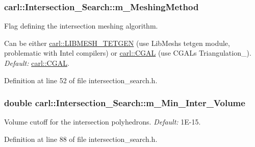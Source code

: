 \subsubsection[{m\+\_\+\+Meshing\+Method}]{ carl\+::\+Intersection\+\_\+\+Search\+::m\+\_\+\+Meshing\+Method\hspace{0.3cm}{\ttfamily [protected]}}\label{classcarl_1_1_intersection___search_afc8983d95c970eaa61c6f4ae50a22f4b}


Flag defining the intersection meshing algorithm. 

Can be either \hyperlink{namespacecarl_a4f72fd25137b97ac1ca1276ec549e5cfa0a91b3dbac7fab7e5efa6f804aab8f58}{carl\+::\+L\+I\+B\+M\+E\+S\+H\+\_\+\+T\+E\+T\+G\+E\+N} (use Lib\+Mesh\textquotesingle{}s tetgen module, problematic with Intel compilers) or \hyperlink{namespacecarl_a4f72fd25137b97ac1ca1276ec549e5cfa509162a828acac7eaad1fc369696a3b1}{carl\+::\+C\+G\+A\+L} (use C\+G\+A\+L\textquotesingle{}s Triangulation\+\_). {\itshape Default\+:} \hyperlink{namespacecarl_a4f72fd25137b97ac1ca1276ec549e5cfa509162a828acac7eaad1fc369696a3b1}{carl\+::\+C\+G\+A\+L}. 

Definition at line 52 of file intersection\+\_\+search.\+h.

\hypertarget{classcarl_1_1_intersection___search_af297d8e504705dbd69d80ca045b947ac}{}
\subsubsection[{m\+\_\+\+Min\+\_\+\+Inter\+\_\+\+Volume}]{\setlength{\rightskip}{0pt plus 5cm}double carl\+::\+Intersection\+\_\+\+Search\+::m\+\_\+\+Min\+\_\+\+Inter\+\_\+\+Volume\hspace{0.3cm}{\ttfamily [protected]}}\label{classcarl_1_1_intersection___search_af297d8e504705dbd69d80ca045b947ac}


Volume cutoff for the intersection polyhedrons. {\itshape Default\+:} 1\+E-\/15. 



Definition at line 88 of file intersection\+\_\+search.\+h.

\hypertarget{classcarl_1_1_intersection___search_af54d17052502ee0d11ec33b915e2074e}{}
